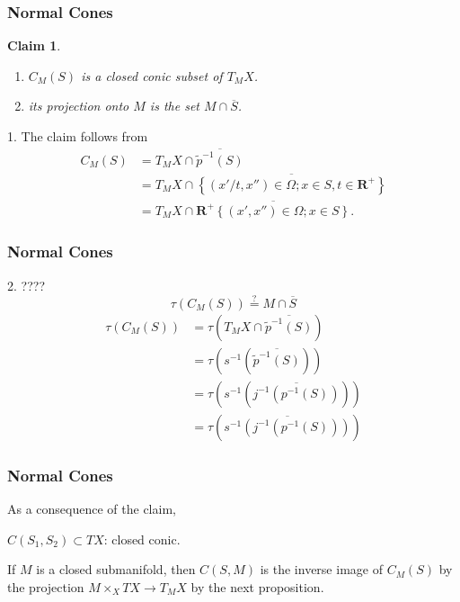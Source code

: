 \documentclass[dvipdfmx,12pt,aspectratio=169,leqno]{beamer}%
\makeatletter
\newcommand{\rr}{\mathbf{R}}
\renewenvironment{proof}[1][\proofname]{\par
  \pushQED{\qed}%
  \normalfont \topsep6\p@\@plus6\p@\relax
  \trivlist
  \item[\hskip\labelsep
         \bfseries
    {#1}]\ignorespaces
}{%
  \popQED\endtrivlist\@endpefalse
}
\renewcommand{\proofname}{\textrm{Proof.}}
\numberwithin{equation}{subsection}
\theoremstyle{mystyle}
\newtheorem{CLM}[AXM]{Claim}
\makeatother
\begin{document}
\begin{frame}
    \frametitle{Normal Cones}

    \begin{CLM}
        \begin{enumerate}
            \item \(C_{M}(S)\) is a closed conic subset of \(T_{M}X\).
            \item its projection onto \(M\) is 
            the set \(M\cap\overline{S}\).
        \end{enumerate}
    \end{CLM}
    \begin{proof}
        1. 
        The claim follows from
        \begin{align*}
            C_{M}(S)
            &=T_{M}X\cap\overline{\widetilde{p}^{-1}(S)}\\
            &=T_{M}X\cap\overline{\left\{(x'/t,x'')\in\varOmega; x\in S, t\in\rr^{+}\right\}}\\
            &=T_{M}X\cap\overline{\rr^{+}\left\{(x',x'')\in\varOmega; x\in S\right\}}.
        \end{align*}
    \end{proof}
\end{frame}

\begin{frame}
    \frametitle{Normal Cones}

    \begin{proof}
        2. ????
        \[\tau(C_{M}(S))\overset{?}{=}M\cap\overline{S}\]
        \begin{align*}
            \tau(C_{M}(S))
            &=\tau(T_{M}X\cap\overline{\widetilde{p}^{-1}(S)})\\
            &=\tau\left(s^{-1}\left(\overline{\widetilde{p}^{-1}(S)}\right)\right)\\
            &=\tau\left(s^{-1}\left(\overline{j^{-1}(p^{-1}(S))}\right)\right)\\
            &=\tau\left(\overline{s^{-1}\left(j^{-1}(p^{-1}(S))\right)}\right)
        \end{align*}
    \end{proof}
\end{frame}

\begin{frame}
    \frametitle{Normal Cones}

    As a consequence of the claim, 
    \begin{center}
        \(C(S_1,S_2)\subset TX\): closed conic.
    \end{center}
    If \(M\) is a closed submanifold, then \(C(S,M)\) is 
    the inverse image of \(C_M(S)\) by the projection \(
        M\times_{X}TX\to T_{M}X
    \) by the next proposition.

\end{frame}
\end{document}
